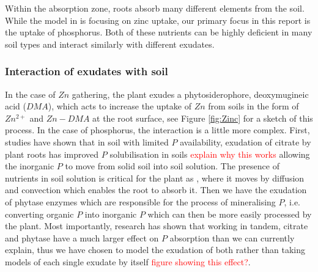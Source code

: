 \documentclass[11pt]{article}
\numberwithin{equation}{section}
\begin{document}
Within the absorption zone, roots absorb many different elements from the soil. While the model in \cite{Ptashnyk-2011} is focusing on zinc uptake, our primary focus in this report is the uptake of phosphorus. Both of these nutrients can be highly deficient in many soil types and interact similarly with different exudates.

\subsubsection{Interaction of exudates with soil}
In the case of $Zn$  gathering, the plant exudes a phytosiderophore, deoxymugineic acid ($DMA$), which acts to increase the uptake of $Zn$ from soils in the form of $Zn^{2+}$ and $Zn-DMA$ at the root surface, see Figure \ref{fig:Zinc} for a sketch of this process. In the case of phosphorus, the interaction is a little more complex. First, studies have shown that in soil with limited $P$ availability, exudation of citrate by plant roots has improved $P$ solubilisation in soils \textcolor{red}{explain why this works} allowing the inorganic $P$ to move from solid soil into soil solution. The presence of nutrients in soil solution is critical for the plant as , where it moves by diffusion and convection which enables the root to absorb it. Then we have the exudation of phytase enzymes which are responsible for the process of mineralising $P$, i.e. converting organic $P$ into inorganic $P$ which can then be more easily processed by the plant. Most importantly, research has shown that working in tandem, citrate and phytase have a much larger effect on $P$ absorption than we can currently explain, thus we have chosen to model the exudation of both rather than taking models of each single exudate by itself \cite{giles_george} \textcolor{red}{figure showing this effect?}.
\end{document}
